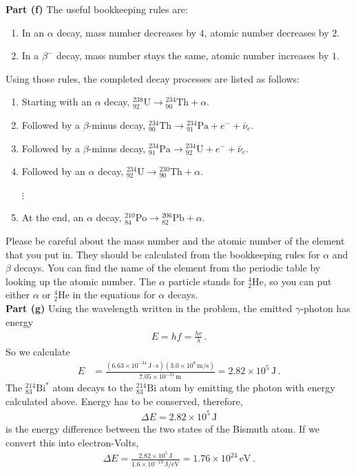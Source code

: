 \documentclass[11pt]{article}
\begin{document}
\noindent\textbf{Part (f)} The useful bookkeeping rules are:
\begin{enumerate}
\item[($\alpha$).] In an $\alpha$ decay, mass number decreases by $4$, atomic number decreases by $2$.
\item[($\beta$).] In a $\beta^-$ decay, mass number stays the same, atomic number increases by $1$.
\end{enumerate}
Using those rules, the completed decay processes are listed as follows:
\begin{enumerate}
\item Starting with an $\alpha$ decay, $^{238}_{92}\text{U} \to {}^{234}_{90}\text{Th} + \alpha$.
\item Followed by a $\beta$-minus decay, $^{234}_{90}\text{Th} \to {}^{234}_{91}\text{Pa} + e^- + \bar{\nu}_e$.
\item Followed by a $\beta$-minus decay, $^{234}_{91}\text{Pa} \to {}^{234}_{92}\text{U} + e^- + \bar{\nu}_e$.
\item Followed by an $\alpha$ decay, $^{234}_{92}\text{U} \to {}^{230}_{90}\text{Th} + \alpha$.

 {}\qquad\qquad$\vdots$
\item[end.] At the end, an $\alpha$ decay, $^{210}_{84}\text{Po} \to {}^{206}_{82}\text{Pb} + \alpha$.
\end{enumerate}
Please be careful about the mass number and the atomic number of the element that you put in. They should be calculated from the bookkeeping rules for $\alpha$ and $\beta$ decays. You can find the name of the element from the periodic table by looking up the atomic number. The $\alpha$ particle stands for ${}^4_2$He, so you can put either $\alpha$ or ${}^4_2$He in the equations for $\alpha$ decays. \\

\noindent\textbf{Part (g)} Using the wavelength written in the problem, the emitted $\gamma$-photon has energy
\begin{align*}
E = hf = \frac{hc}{\lambda}\,.
\end{align*}
So we calculate
\begin{align*}
E &= \frac{(6.63\times 10^{-34}\,\text{J}\cdot \text{s})(3.0\times 10^8\,\text{m/s})}{7.05\times 10^{-31}\,\text{m}}= 2.82\times 10^5\,\text{J}\,.
\end{align*}
The $^{214}_{83}\text{Bi}^*$ atom decays to the $^{214}_{83}\text{Bi}$ atom by emitting the photon with energy calculated above. Energy has to be conserved, therefore,
\begin{align*}
\Delta E = 2.82\times 10^5\,\text{J}
\end{align*}
is the energy difference between the two states of the Bismuth atom. If we convert this into electron-Volts,
\begin{align*}
\Delta E = \frac{2.82\times 10^5\,\text{J}}{1.6\times 10^{-19}\,\text{J/eV}}
= 1.76\times 10^{24}\,\text{eV}\,.
\end{align*}
\end{document}
